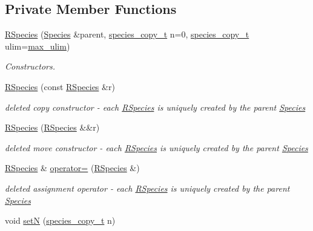 \subsection*{Private Member Functions}
\begin{DoxyCompactItemize}
\item 
\hyperlink{classchem_1_1RSpecies_a66b426fdb13ec0e9ec61a96fadda465d}{R\-Species} (\hyperlink{classchem_1_1Species}{Species} \&parent, \hyperlink{common_8h_a3503f321fd36304ee274141275cca586}{species\-\_\-copy\-\_\-t} n=0, \hyperlink{common_8h_a3503f321fd36304ee274141275cca586}{species\-\_\-copy\-\_\-t} ulim=\hyperlink{common_8h_adaf831a0b61083f29adf8fc6e8edab35}{max\-\_\-ulim})
\begin{DoxyCompactList}\small\item\em Constructors. \end{DoxyCompactList}\item 
\hyperlink{classchem_1_1RSpecies_aed7fd68d286fab8190372a4dd98c14e3}{R\-Species} (const \hyperlink{classchem_1_1RSpecies}{R\-Species} \&r)
\begin{DoxyCompactList}\small\item\em deleted copy constructor -\/ each \hyperlink{classchem_1_1RSpecies}{R\-Species} is uniquely created by the parent \hyperlink{classchem_1_1Species}{Species} \end{DoxyCompactList}\item 
\hyperlink{classchem_1_1RSpecies_a06341eaeb5d6c30bf7812b08354b6b19}{R\-Species} (\hyperlink{classchem_1_1RSpecies}{R\-Species} \&\&r)
\begin{DoxyCompactList}\small\item\em deleted move constructor -\/ each \hyperlink{classchem_1_1RSpecies}{R\-Species} is uniquely created by the parent \hyperlink{classchem_1_1Species}{Species} \end{DoxyCompactList}\item 
\hyperlink{classchem_1_1RSpecies}{R\-Species} \& \hyperlink{classchem_1_1RSpecies_a2779fcf9c5103251aa87e7b466ba7752}{operator=} (\hyperlink{classchem_1_1RSpecies}{R\-Species} \&)
\begin{DoxyCompactList}\small\item\em deleted assignment operator -\/ each \hyperlink{classchem_1_1RSpecies}{R\-Species} is uniquely created by the parent \hyperlink{classchem_1_1Species}{Species} \end{DoxyCompactList}\item 
void \hyperlink{classchem_1_1RSpecies_a7939d5255e97d125821f657cadb48bc2}{set\-N} (\hyperlink{common_8h_a3503f321fd36304ee274141275cca586}{species\-\_\-copy\-\_\-t} n)

\end{DoxyCompactItemize}
